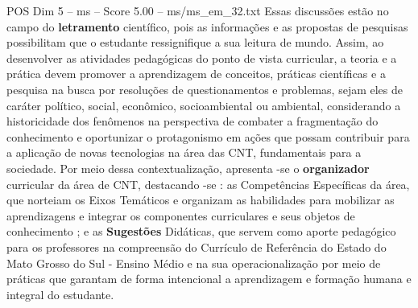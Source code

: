 \begin{textsample}{POS Dim 5 – ms – Score 5.00 – ms/ms\_em\_32.txt}
Essas discussões estão no campo do \textbf{letramento} científico, pois as informações e as propostas de pesquisas possibilitam que o estudante ressignifique a sua leitura de mundo.
Assim, ao desenvolver as atividades pedagógicas do ponto de vista curricular, a teoria e a prática devem promover a aprendizagem de conceitos, práticas científicas e a pesquisa na busca por resoluções de questionamentos e problemas, sejam eles de caráter político, social, econômico, socioambiental ou ambiental, considerando a historicidade dos fenômenos na perspectiva de combater a fragmentação do conhecimento e oportunizar o protagonismo em ações que possam contribuir para a aplicação de novas tecnologias na área das CNT, fundamentais para a sociedade.
Por meio dessa contextualização, apresenta -se o \textbf{organizador} curricular da área de CNT, destacando -se : as Competências Específicas da área, que norteiam os Eixos Temáticos e organizam as habilidades para mobilizar as aprendizagens e integrar os componentes curriculares e seus objetos de conhecimento ; e as \textbf{Sugestões} Didáticas, que servem como aporte pedagógico para os professores na compreensão do Currículo de Referência do Estado do Mato Grosso do Sul - Ensino Médio e na sua operacionalização por meio de práticas que garantam de forma intencional a aprendizagem e formação humana e integral do estudante.

\end{textsample}
